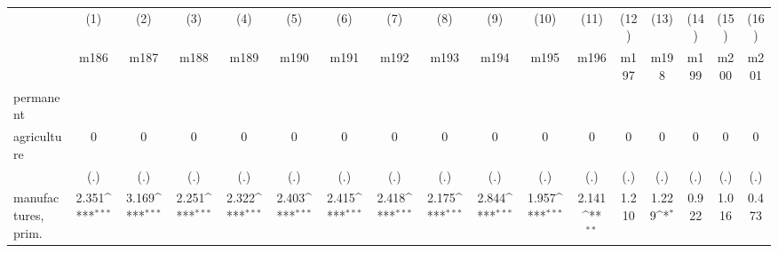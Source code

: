 {
\def\sym#1{\ifmmode^{#1}\else\(^{#1}\)\fi}
\begin{tabular}{l*{16}{c}}
\hline\hline
                    &\multicolumn{1}{c}{(1)}&\multicolumn{1}{c}{(2)}&\multicolumn{1}{c}{(3)}&\multicolumn{1}{c}{(4)}&\multicolumn{1}{c}{(5)}&\multicolumn{1}{c}{(6)}&\multicolumn{1}{c}{(7)}&\multicolumn{1}{c}{(8)}&\multicolumn{1}{c}{(9)}&\multicolumn{1}{c}{(10)}&\multicolumn{1}{c}{(11)}&\multicolumn{1}{c}{(12)}&\multicolumn{1}{c}{(13)}&\multicolumn{1}{c}{(14)}&\multicolumn{1}{c}{(15)}&\multicolumn{1}{c}{(16)}\\
                    &\multicolumn{1}{c}{m186}&\multicolumn{1}{c}{m187}&\multicolumn{1}{c}{m188}&\multicolumn{1}{c}{m189}&\multicolumn{1}{c}{m190}&\multicolumn{1}{c}{m191}&\multicolumn{1}{c}{m192}&\multicolumn{1}{c}{m193}&\multicolumn{1}{c}{m194}&\multicolumn{1}{c}{m195}&\multicolumn{1}{c}{m196}&\multicolumn{1}{c}{m197}&\multicolumn{1}{c}{m198}&\multicolumn{1}{c}{m199}&\multicolumn{1}{c}{m200}&\multicolumn{1}{c}{m201}\\
\hline
permanent           &                     &                     &                     &                     &                     &                     &                     &                     &                     &                     &                     &                     &                     &                     &                     &                     \\
agriculture         &           0         &           0         &           0         &           0         &           0         &           0         &           0         &           0         &           0         &           0         &           0         &           0         &           0         &           0         &           0         &           0         \\
                    &         (.)         &         (.)         &         (.)         &         (.)         &         (.)         &         (.)         &         (.)         &         (.)         &         (.)         &         (.)         &         (.)         &         (.)         &         (.)         &         (.)         &         (.)         &         (.)         \\
[1em]
manufactures, prim. &       2.351\sym{***}&       3.169\sym{***}&       2.251\sym{***}&       2.322\sym{***}&       2.403\sym{***}&       2.415\sym{***}&       2.418\sym{***}&       2.175\sym{***}&       2.844\sym{***}&       1.957\sym{***}&       2.141\sym{**} &       1.210         &       1.229\sym{*}  &       0.922         &       1.016         &       0.473         \\

\end{tabular}}
